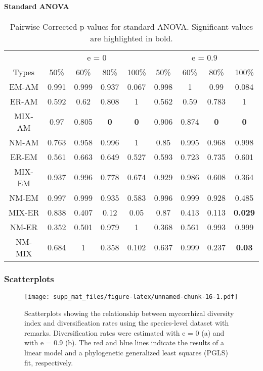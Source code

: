 \documentclass[]{article}
\let\oldparagraph\paragraph
\renewcommand{\paragraph}[1]{\oldparagraph{#1}\mbox{}}
\begin{document}
\hypertarget{standard-anova-3}{%
\paragraph{Standard ANOVA}\label{standard-anova-3}}

\begin{table}[H]

\caption{\label{tab:unnamed-chunk-15}Pairwise Corrected p-values for standard ANOVA. Significant values are highlighted in bold.}
\centering
\begin{tabular}{c|c|c|c|c|c|c|c|c}
\hline
\multicolumn{1}{c|}{ } & \multicolumn{4}{c|}{e = 0} & \multicolumn{4}{c}{e = 0.9} \\
\cline{2-5} \cline{6-9}
Types & 50\% & 60\% & 80\% & 100\% & 50\% & 60\% & 80\% & 100\%\\
\hline
EM-AM & 0.991 & 0.999 & 0.937 & 0.067 & 0.998 & 1 & 0.99 & 0.084\\
\hline
ER-AM & 0.592 & 0.62 & 0.808 & 1 & 0.562 & 0.59 & 0.783 & 1\\
\hline
MIX-AM & 0.97 & 0.805 & \textbf{0} & \textbf{0} & 0.906 & 0.874 & \textbf{0} & \textbf{0}\\
\hline
NM-AM & 0.763 & 0.958 & 0.996 & 1 & 0.85 & 0.995 & 0.968 & 0.998\\
\hline
ER-EM & 0.561 & 0.663 & 0.649 & 0.527 & 0.593 & 0.723 & 0.735 & 0.601\\
\hline
MIX-EM & 0.937 & 0.996 & 0.778 & 0.674 & 0.929 & 0.986 & 0.608 & 0.364\\
\hline
NM-EM & 0.997 & 0.999 & 0.935 & 0.583 & 0.996 & 0.999 & 0.928 & 0.485\\
\hline
MIX-ER & 0.838 & 0.407 & 0.12 & 0.05 & 0.87 & 0.413 & 0.113 & \textbf{0.029}\\
\hline
NM-ER & 0.352 & 0.501 & 0.979 & 1 & 0.368 & 0.561 & 0.993 & 0.999\\
\hline
NM-MIX & 0.684 & 1 & 0.358 & 0.102 & 0.637 & 0.999 & 0.237 & \textbf{0.03}\\
\hline
\end{tabular}
\end{table}

\hypertarget{scatterplots-1}{%
\subsubsection{Scatterplots}\label{scatterplots-1}}

\begin{figure}
\centering
\texttt{[image: supp\_mat\_files/figure-latex/unnamed-chunk-16-1.pdf]}
\caption{Scatterplots showing the relationship between mycorrhizal
diversity index and diversification rates using the species-level
dataset with remarks. Diversification rates were estimated with e = 0
(a) and with e = 0.9 (b). The red and blue lines indicate the results of
a linear model and a phylogenetic generalized least squares (PGLS) fit,
respectively.}
\end{figure}
\end{document}
